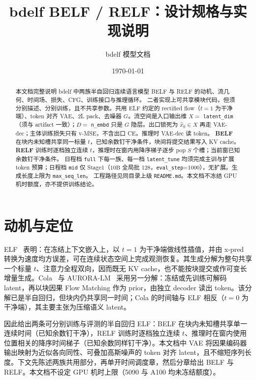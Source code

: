 \documentclass[UTF8,a4paper,11pt]{ctexart}
\title{bdelf BELF / RELF：设计规格与实现说明}
\author{bdelf 模型文档}
\date{\today}
\begin{document}
\maketitle

\begin{abstract}
本文档完整说明 bdelf 中两族半自回归连续语言模型 BELF 与 RELF 的动机、流几何、时间场、损失、CFG、训练接口与推理循环。
二者实现上可共享模块代码，但须分别描述、分别训练，且不共享参数。共用 ELF 约定的 rectified flow（\(t=1\) 为干净端）、token 对齐 VAE、2L pack、去噪器 \(G\)。流空间是入口输出维 \(X=\) \texttt{latent\_dim}（须与 artifact 一致）；\(D=\) \texttt{n\_embd} 只是 \(G\) 隐层。出口锁死为 \(\hat x_0\in X\) 再走 VAE-dec；主体训练损失只有 v-MSE，不含出口 CE。推理时 VAE-dec 读 token。
\textbf{BELF} 在块内未知槽共享同一标量 \(t\)，已知余数钉干净条件，块间将提交结果写入 KV cache。
\textbf{RELF} 训练时逐档独立连续 \(t\)，推理时在窗内用降序梯子逐步 pop \(S\) 个槽；当前窗已知余数钉干净条件。
日程档 \texttt{full} 下每一族、每一档 \texttt{latent\_tune} 均须完成主训与扩展 token 预算；日程档 \texttt{mid} 仅 Stage1（\(10\mathrm{B}\) 全局批 128，\texttt{eval\_step}=1000），无扩展。生成长度上限为 \texttt{max\_seq\_len}。
工程路径见同目录上级 \texttt{README.md}。本文档不冻结 GPU 机时额度，亦不提供训练结论。
\end{abstract}

\section{动机与定位}

ELF~\cite{elf2026} 表明：在冻结上下文嵌入上，以 \(t=1\) 为干净端做线性插值，并由 x-pred 转换为速度均方误差，可在连续状态空间上完成观测恢复。其生成分解为整句共享一个标量 \(t\)、注意力全程双向，因而既无 KV cache，也不能按块提交或作可变长增量生成。Cola~\cite{cola2026} 与 AURORA-LM~\cite{aurora2026} 采用另一分解：冻结或先训练可解码 latent，再以块因果 Flow Matching 作为 prior，由独立 decoder 读出 token。该分解已是半自回归，但块内仍共享同一时间；Cola 的时间轴与 ELF 相反（\(t=0\) 为干净端），其主要主张为压缩语义 latent。

因此给出两条可分别训练与评测的半自回归 ELF：BELF 在块内未知槽共享单一连续时间（已知余数钉干净），RELF 训练时逐档独立连续 \(t\)、推理时在窗内使用位置相关的降序时间梯子（已知余数同样钉干净）。本文档中 VAE 将因果编码器输出映射为近似各向同性、可叠加高斯噪声的 token 对齐 latent，且不缩短序列长度。下文先陈述两族共用部分，再单开时间调度章，然后分章给出 BELF 与 RELF。本文档不设定 GPU 机时上限（5090 与 A100 均未冻结额度）。
\end{document}
